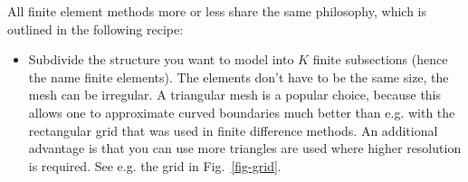 \pagebreak



All finite element methods more or less share the same philosophy, which is outlined in the following recipe:

\begin{itemize}
\item
Subdivide the structure you want to model into $K$ finite subsections (hence the name finite elements). The elements don't have to be the same size, the mesh can be irregular. A triangular mesh is a popular choice, because this allows one to approximate curved boundaries much better than e.g. with the rectangular grid that was used in finite difference methods. An additional advantage is that you can use more triangles are used where higher resolution is required. See e.g. the grid in Fig.~\ref{fig-grid}.


\end{itemize}
